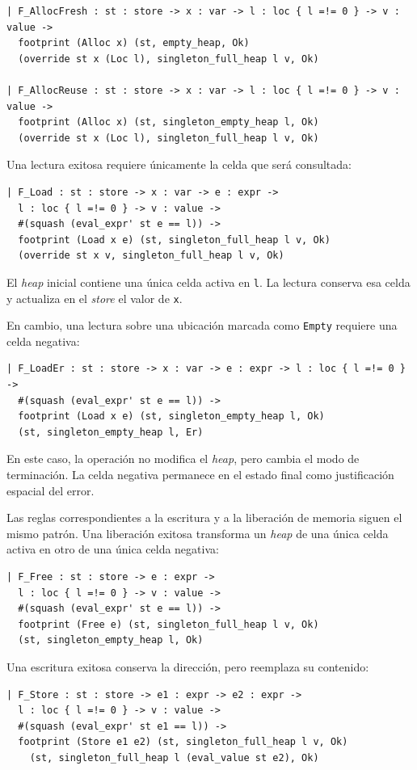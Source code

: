 \documentclass[a4paper,	11pt]{report}
\begin{document}
\begin{lstlisting}
| F_AllocFresh : st : store -> x : var -> l : loc { l =!= 0 } -> v : value ->
  footprint (Alloc x) (st, empty_heap, Ok) 
  (override st x (Loc l), singleton_full_heap l v, Ok)

| F_AllocReuse : st : store -> x : var -> l : loc { l =!= 0 } -> v : value ->
  footprint (Alloc x) (st, singleton_empty_heap l, Ok)
  (override st x (Loc l), singleton_full_heap l v, Ok)
\end{lstlisting}

Una lectura exitosa requiere únicamente la celda que será consultada:

\begin{lstlisting}
| F_Load : st : store -> x : var -> e : expr ->
  l : loc { l =!= 0 } -> v : value ->
  #(squash (eval_expr' st e == l)) ->
  footprint (Load x e) (st, singleton_full_heap l v, Ok)
  (override st x v, singleton_full_heap l v, Ok)
\end{lstlisting}
El \emph{heap} inicial contiene una única celda activa en \lstinline|l|.
La lectura conserva esa celda y actualiza en el \emph{store} el valor de \lstinline|x|.

En cambio,
una lectura sobre una ubicación marcada como \lstinline|Empty| requiere una celda negativa:

\begin{lstlisting}
| F_LoadEr : st : store -> x : var -> e : expr -> l : loc { l =!= 0 } ->
  #(squash (eval_expr' st e == l)) ->
  footprint (Load x e) (st, singleton_empty_heap l, Ok)
  (st, singleton_empty_heap l, Er)
\end{lstlisting}
En este caso, la operación no modifica el \emph{heap},
pero cambia el modo de terminación.
La celda negativa permanece en el estado final como justificación espacial del error.

Las reglas correspondientes a la escritura y a la liberación de memoria siguen el mismo patrón.
Una liberación exitosa transforma un \emph{heap} de una única celda activa en otro de una única celda negativa:

\begin{lstlisting}
| F_Free : st : store -> e : expr ->
  l : loc { l =!= 0 } -> v : value ->
  #(squash (eval_expr' st e == l)) ->
  footprint (Free e) (st, singleton_full_heap l v, Ok)
  (st, singleton_empty_heap l, Ok)
\end{lstlisting}
Una escritura exitosa conserva la dirección,
pero reemplaza su contenido:

\begin{lstlisting}
| F_Store : st : store -> e1 : expr -> e2 : expr ->
  l : loc { l =!= 0 } -> v : value ->
  #(squash (eval_expr' st e1 == l)) ->
  footprint (Store e1 e2) (st, singleton_full_heap l v, Ok)
    (st, singleton_full_heap l (eval_value st e2), Ok)
\end{lstlisting}
\end{document}
